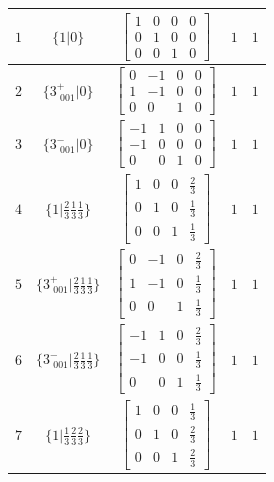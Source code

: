 \documentclass[fleqn,8pt]{jsarticle}
\begin{document}
\begin{longtable}{ccccc}
$ 1 $ & $ \{1|0\} $ & $ \begin{bmatrix} 1 & 0 & 0 & 0 \\ 0 & 1 & 0 & 0 \\ 0 & 0 & 1 & 0 \end{bmatrix} $ & $ 1 $ & $ 1 $ \\ \hline
$ 2 $ & $ \{3^{+}_{\,\,001}|0\} $ & $ \begin{bmatrix} 0 & -1 & 0 & 0 \\ 1 & -1 & 0 & 0 \\ 0 & 0 & 1 & 0 \end{bmatrix} $ & $ 1 $ & $ 1 $ \\ \hline
$ 3 $ & $ \{3^{-}_{\,\,001}|0\} $ & $ \begin{bmatrix} -1 & 1 & 0 & 0 \\ -1 & 0 & 0 & 0 \\ 0 & 0 & 1 & 0 \end{bmatrix} $ & $ 1 $ & $ 1 $ \\ \hline
$ 4 $ & $ \{1|\frac{2}{3} \frac{1}{3} \frac{1}{3}\} $ & $ \begin{bmatrix} 1 & 0 & 0 & \frac{2}{3} \\ 0 & 1 & 0 & \frac{1}{3} \\ 0 & 0 & 1 & \frac{1}{3} \end{bmatrix} $ & $ 1 $ & $ 1 $ \\ \hline
$ 5 $ & $ \{3^{+}_{\,\,001}|\frac{2}{3} \frac{1}{3} \frac{1}{3}\} $ & $ \begin{bmatrix} 0 & -1 & 0 & \frac{2}{3} \\ 1 & -1 & 0 & \frac{1}{3} \\ 0 & 0 & 1 & \frac{1}{3} \end{bmatrix} $ & $ 1 $ & $ 1 $ \\ \hline
$ 6 $ & $ \{3^{-}_{\,\,001}|\frac{2}{3} \frac{1}{3} \frac{1}{3}\} $ & $ \begin{bmatrix} -1 & 1 & 0 & \frac{2}{3} \\ -1 & 0 & 0 & \frac{1}{3} \\ 0 & 0 & 1 & \frac{1}{3} \end{bmatrix} $ & $ 1 $ & $ 1 $ \\ \hline
$ 7 $ & $ \{1|\frac{1}{3} \frac{2}{3} \frac{2}{3}\} $ & $ \begin{bmatrix} 1 & 0 & 0 & \frac{1}{3} \\ 0 & 1 & 0 & \frac{2}{3} \\ 0 & 0 & 1 & \frac{2}{3} \end{bmatrix} $ & $ 1 $ & $ 1 $ \\ \hline

\end{longtable}
\end{document}
